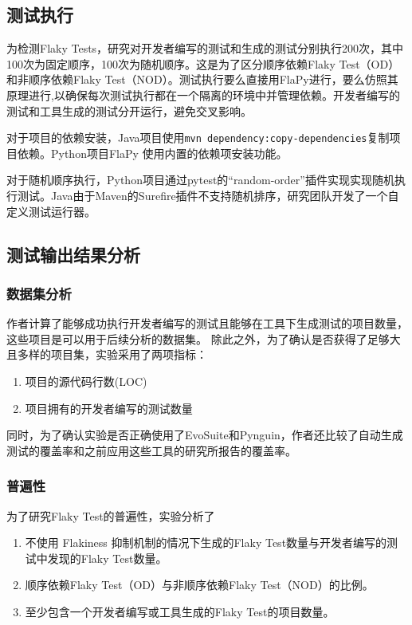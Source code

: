 \documentclass{article}
\newcommand{\flakyTest}{Flaky Test}
\begin{document}
\subsection{测试执行}

为检测\flakyTest s，研究对开发者编写的测试和生成的测试分别执行200次，其中100次为固定顺序，100次为随机顺序。这是为了区分顺序依赖\flakyTest（OD）和非顺序依赖\flakyTest（NOD）。测试执行要么直接用FlaPy进行，要么仿照其原理进行,以确保每次测试执行都在一个隔离的环境中并管理依赖。开发者编写的测试和工具生成的测试分开运行，避免交叉影响。

对于项目的依赖安装，Java项目使用\texttt{mvn dependency:copy-dependencies}复制项目依赖。Python项目FlaPy 使用内置的依赖项安装功能。

对于随机顺序执行，Python项目通过pytest的“random-order”插件实现实现随机执行测试。Java由于Maven的Surefire插件不支持随机排序，研究团队开发了一个自定义测试运行器。

\subsection{测试输出结果分析}

\subsubsection{数据集分析}

作者计算了能够成功执行开发者编写的测试且能够在工具下生成测试的项目数量，这些项目是可以用于后续分析的数据集。
除此之外，为了确认是否获得了足够大且多样的项目集，实验采用了两项指标：
\begin{enumerate}[label=(\arabic*),noitemsep]
    \item 项目的源代码行数(LOC)
    \item 项目拥有的开发者编写的测试数量
\end{enumerate}
同时，为了确认实验是否正确使用了EvoSuite和Pynguin，作者还比较了自动生成测试的覆盖率和之前应用这些工具的研究所报告的覆盖率。

\subsubsection{普遍性}

为了研究\flakyTest 的普遍性，实验分析了

\begin{enumerate}[label=(\arabic*),noitemsep]
    \item 不使用 Flakiness 抑制机制的情况下生成的\flakyTest 数量与开发者编写的测试中发现的\flakyTest 数量。
    \item 顺序依赖\flakyTest （OD）与非顺序依赖\flakyTest （NOD）的比例。
    \item 至少包含一个开发者编写或工具生成的\flakyTest 的项目数量。
\end{enumerate}
\end{document}
